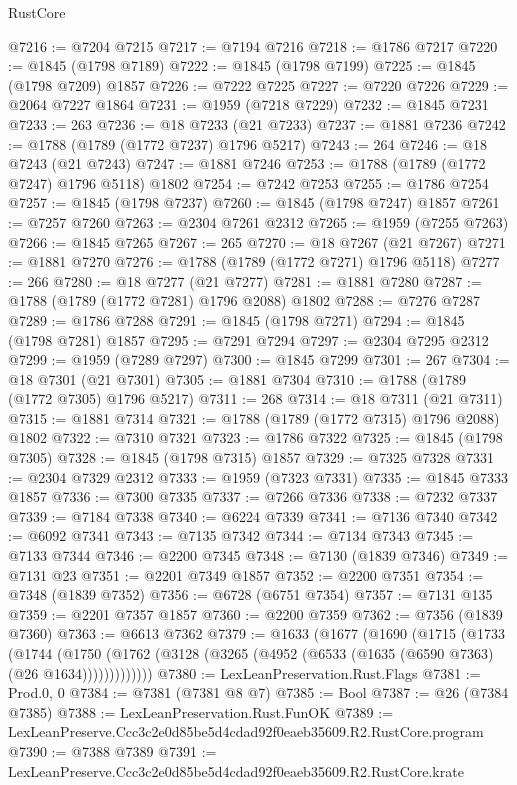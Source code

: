 \begin{lexlean}{RustCore}
\begin{coremodule}
@7216 := @7204 @7215
@7217 := @7194 @7216
@7218 := @1786 @7217
@7220 := @1845 (@1798 @7189)
@7222 := @1845 (@1798 @7199)
@7225 := @1845 (@1798 @7209) @1857
@7226 := @7222 @7225
@7227 := @7220 @7226
@7229 := @2064 @7227 @1864
@7231 := @1959 (@7218 @7229)
@7232 := @1845 @7231
@7233 := 263
@7236 := @18 @7233 (@21 @7233)
@7237 := @1881 @7236
@7242 := @1788 (@1789 (@1772 @7237) @1796 @5217)
@7243 := 264
@7246 := @18 @7243 (@21 @7243)
@7247 := @1881 @7246
@7253 := @1788 (@1789 (@1772 @7247) @1796 @5118) @1802
@7254 := @7242 @7253
@7255 := @1786 @7254
@7257 := @1845 (@1798 @7237)
@7260 := @1845 (@1798 @7247) @1857
@7261 := @7257 @7260
@7263 := @2304 @7261 @2312
@7265 := @1959 (@7255 @7263)
@7266 := @1845 @7265
@7267 := 265
@7270 := @18 @7267 (@21 @7267)
@7271 := @1881 @7270
@7276 := @1788 (@1789 (@1772 @7271) @1796 @5118)
@7277 := 266
@7280 := @18 @7277 (@21 @7277)
@7281 := @1881 @7280
@7287 := @1788 (@1789 (@1772 @7281) @1796 @2088) @1802
@7288 := @7276 @7287
@7289 := @1786 @7288
@7291 := @1845 (@1798 @7271)
@7294 := @1845 (@1798 @7281) @1857
@7295 := @7291 @7294
@7297 := @2304 @7295 @2312
@7299 := @1959 (@7289 @7297)
@7300 := @1845 @7299
@7301 := 267
@7304 := @18 @7301 (@21 @7301)
@7305 := @1881 @7304
@7310 := @1788 (@1789 (@1772 @7305) @1796 @5217)
@7311 := 268
@7314 := @18 @7311 (@21 @7311)
@7315 := @1881 @7314
@7321 := @1788 (@1789 (@1772 @7315) @1796 @2088) @1802
@7322 := @7310 @7321
@7323 := @1786 @7322
@7325 := @1845 (@1798 @7305)
@7328 := @1845 (@1798 @7315) @1857
@7329 := @7325 @7328
@7331 := @2304 @7329 @2312
@7333 := @1959 (@7323 @7331)
@7335 := @1845 @7333 @1857
@7336 := @7300 @7335
@7337 := @7266 @7336
@7338 := @7232 @7337
@7339 := @7184 @7338
@7340 := @6224 @7339
@7341 := @7136 @7340
@7342 := @6092 @7341
@7343 := @7135 @7342
@7344 := @7134 @7343
@7345 := @7133 @7344
@7346 := @2200 @7345
@7348 := @7130 (@1839 @7346)
@7349 := @7131 @23
@7351 := @2201 @7349 @1857
@7352 := @2200 @7351
@7354 := @7348 (@1839 @7352)
@7356 := @6728 (@6751 @7354)
@7357 := @7131 @135
@7359 := @2201 @7357 @1857
@7360 := @2200 @7359
@7362 := @7356 (@1839 @7360)
@7363 := @6613 @7362
@7379 := @1633
    (@1677
      (@1690
        (@1715
          (@1733
            (@1744
              (@1750 (@1762 (@3128 (@3265 (@4952 (@6533 (@1635 (@6590 @7363) (@26 @1634)))))))))))))
@7380 := LexLeanPreservation.Rust.Flags
@7381 := Prod.{0, 0}
@7384 := @7381 (@7381 @8 @7)
@7385 := Bool
@7387 := @26 (@7384 @7385)
@7388 := LexLeanPreservation.Rust.FunOK
@7389 := LexLeanPreserve.Ccc3c2e0d85be5d4cdad92f0eaeb35609.R2.RustCore.program
@7390 := @7388 @7389
@7391 := LexLeanPreserve.Ccc3c2e0d85be5d4cdad92f0eaeb35609.R2.RustCore.krate

\end{coremodule}
\end{lexlean}
